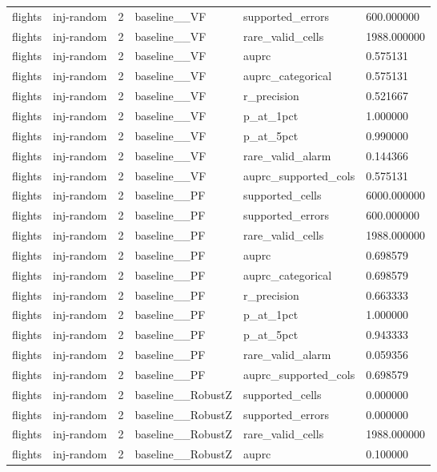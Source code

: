 \begin{tabular}{llllll}
flights & inj-random & 2 & baseline\_\_VF & supported\_errors & 600.000000 \\
flights & inj-random & 2 & baseline\_\_VF & rare\_valid\_cells & 1988.000000 \\
flights & inj-random & 2 & baseline\_\_VF & auprc & 0.575131 \\
flights & inj-random & 2 & baseline\_\_VF & auprc\_categorical & 0.575131 \\
flights & inj-random & 2 & baseline\_\_VF & r\_precision & 0.521667 \\
flights & inj-random & 2 & baseline\_\_VF & p\_at\_1pct & 1.000000 \\
flights & inj-random & 2 & baseline\_\_VF & p\_at\_5pct & 0.990000 \\
flights & inj-random & 2 & baseline\_\_VF & rare\_valid\_alarm & 0.144366 \\
flights & inj-random & 2 & baseline\_\_VF & auprc\_supported\_cols & 0.575131 \\
flights & inj-random & 2 & baseline\_\_PF & supported\_cells & 6000.000000 \\
flights & inj-random & 2 & baseline\_\_PF & supported\_errors & 600.000000 \\
flights & inj-random & 2 & baseline\_\_PF & rare\_valid\_cells & 1988.000000 \\
flights & inj-random & 2 & baseline\_\_PF & auprc & 0.698579 \\
flights & inj-random & 2 & baseline\_\_PF & auprc\_categorical & 0.698579 \\
flights & inj-random & 2 & baseline\_\_PF & r\_precision & 0.663333 \\
flights & inj-random & 2 & baseline\_\_PF & p\_at\_1pct & 1.000000 \\
flights & inj-random & 2 & baseline\_\_PF & p\_at\_5pct & 0.943333 \\
flights & inj-random & 2 & baseline\_\_PF & rare\_valid\_alarm & 0.059356 \\
flights & inj-random & 2 & baseline\_\_PF & auprc\_supported\_cols & 0.698579 \\
flights & inj-random & 2 & baseline\_\_RobustZ & supported\_cells & 0.000000 \\
flights & inj-random & 2 & baseline\_\_RobustZ & supported\_errors & 0.000000 \\
flights & inj-random & 2 & baseline\_\_RobustZ & rare\_valid\_cells & 1988.000000 \\
flights & inj-random & 2 & baseline\_\_RobustZ & auprc & 0.100000 \\

\end{tabular}
